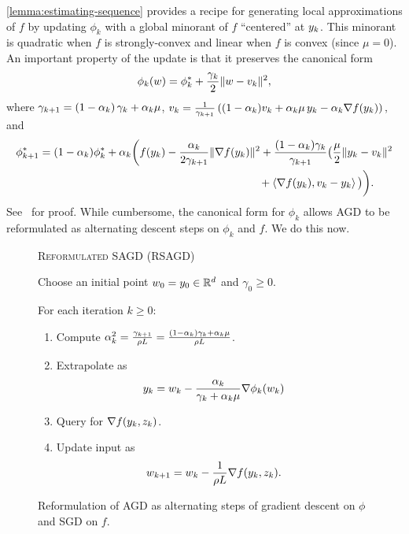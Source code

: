 \autoref{lemma:estimating-sequence} provides a recipe for generating local approximations of \( f \) by updating \( \phi_k \) with a global minorant of \( f \) ``centered'' at \( y_k \). 
This minorant is quadratic when \( f \) is strongly-convex and linear when \( f \) is convex (since \( \mu = 0 \)).
An important property of the update is that it preserves the canonical form
\begin{align}
    \phi_k(w) = \phi_k^* + \frac{\gamma_k}{2}\|w - v_k\|^2,\label{eq:canonical-form}
\end{align}
where \( \gamma_{k+1} = \left(1 - \alpha_{k}\right)\gamma_k + \alpha_{k} \mu \), \( v_k = \frac{1}{\gamma_{k+1}} \left((1-\alpha_{k})v_k + \alpha_{k} \mu \, y_k - \alpha_{k} \nabla f(y_k)\right), \) and 
\begin{align*}
    \phi^*_{k+1} &= (1 - \alphak) \phi^*_k + \alphak\bigg(f(\yk) - \frac{\alphak}{2 \gamma_{k+1}} \norm{\grad(\yk)}^2 + \frac{(1 - \alphak)\gamma_k}{\gamma_{k+1}} \big(\frac{\mu}{2}\norm{\yk - \vk}^2\\ 
    & \hspace{20em} + \abr{\grad(\yk), \vk - \yk} \big) \bigg). 
\end{align*}
See~\citet[Lemma 2.2.3]{nesterov2004lectures} for proof.
While cumbersome, the canonical form for \( \phi_k \) allows \ac{AGD} to be reformulated as alternating descent steps on \( \phi_k \) and \( f \).
We do this now.

\begin{figure}[t]
    \centering
    \begin{procedure}{\textsc{Reformulated} \ac{SAGD} (\acs{RSAGD})}
        \item Choose an initial point \( w_0 = y_0 \in \mathbb{R}^d \) and \( \gamma_0 \geq 0 \).
        \item For each iteration \( k \geq 0 \):
            \begin{enumerate}
                \item Compute 
                    \( \alpha^2_k = \frac{\gamma_{k+1}}{\rho L } = \frac{(1-\alpha_k)\gamma_k + \alpha_k \mu}{\rho L} \).
                \item Extrapolate as
                    \[ y_k = w_k - \frac{\alpha_k}{\gamma_k + \alpha_k \mu} \nabla \phi_k(w_k) \]

                \item Query \oracle{} for \( \nabla f(y_k, z_{k}) \). 
                \item Update input as\vspace{-1ex}%
                    \[ w_{k+1} = w_k - \frac{1}{\rho L} \nabla f(y_k, z_{k}). \]
            \end{enumerate}
    \end{procedure}
    \caption[Reformulation of Nesterov's accelerated gradient descent as an alternating descent procedure.]%
        {Reformulation of \ac{AGD} as alternating steps of gradient descent on \( \phi \) and \ac{SGD} on \( f \).}%
    \label{procedure:reformulated-agd}
\end{figure}

